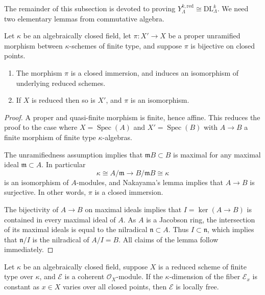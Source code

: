 \documentclass[11pt]{alggeom}
\newcommand{\iso}{\cong}
\newcommand{\red}{\mathrm{red}}
\newcommand{\co}{\mathcal O}
\DeclareMathOperator{\Spec}{Spec}
\begin{document}
The remainder of this subsection is devoted to proving $Y_\Lambda^{k,\red} \iso \mathrm{DL}_\Lambda^k$.  We need two elementary lemmas from commutative algebra.



\begin{lemma}\label{lem:general iso}
Let $\kappa$ be an algebraically closed field, let  $\pi :X' \to X$ be a proper unramified morphism between $\kappa$-schemes of finite type, and suppose $\pi$  is bijective on closed points.
\begin{enumerate}
\item
The morphism $\pi$ is a closed immersion, and induces an isomorphism of underlying reduced schemes.
\item
If $X$ is reduced then so is $X'$, and $\pi$ is an isomorphism.
\end{enumerate}
\end{lemma}

\begin{proof}
A proper and quasi-finite morphism is finite, hence affine.
This reduces the proof to the case where $X=\Spec(A)$ and $X'=\Spec(B)$ with $A\to B$ a finite morphism of finite type $\kappa$-algebras.

The unramifiedness assumption implies that  $\mathfrak{m}  B \subset B$ is maximal for any maximal ideal $\mathfrak{m}\subset A$.  
In particular 
\[
\kappa \iso A/\mathfrak{m} \to B/  \mathfrak{m}  B\iso \kappa
\]
 is an isomorphism of $A$-modules, and  Nakayama's lemma implies that $ A \to B$  is surjective.  
 In other words,   $\pi$ is a closed immersion.
 
 
 The bijectivity of $A \to B$ on maximal ideals implies  that $I=\ker(A\to B)$ is contained in every maximal ideal of $A$. 
 As $A$ is a Jacobson ring, the intersection of its maximal ideals is equal to the  nilradical $\mathfrak{n} \subset A$.
 Thus $I \subset \mathfrak{n}$, which implies that  $\mathfrak{n} / I$ is the nilradical of $A/I =B$.
All claims of the lemma follow immediately.
\end{proof}




\begin{lemma}\label{lem:bundle criterion}
Let $\kappa$ be an algebraically closed field, suppose $X$ is a reduced scheme of finite type over $\kappa$, and $\mathcal{E}$ is a coherent $\co_X$-module.
If the $\kappa$-dimension of the fiber $\mathcal{E}_x$  is constant as $x\in X$ varies over all closed points, then $\mathcal{E}$ is locally free.
\end{lemma}
\end{document}
